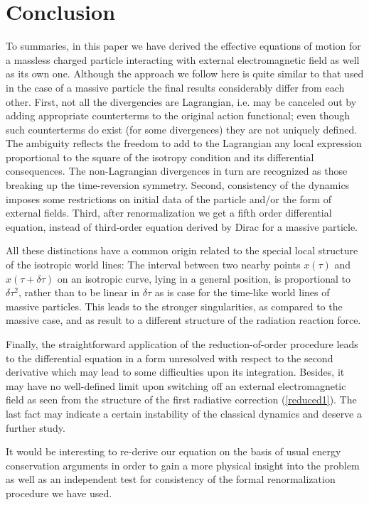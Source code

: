 \documentclass[a4paper,12pt]{article}
\begin{document}
\section{Conclusion}

To summaries, in this paper we have derived the effective
equations of motion for a massless charged particle interacting
with external electromagnetic field as well as its own one.
Although the approach we follow here is quite similar to that
used in the case of a massive particle \cite{KLS} the final
results considerably differ from each other. First, not all the
divergencies are Lagrangian, i.e. may be canceled out by adding
appropriate counterterms to the original action functional; even
though such counterterms do exist (for some divergences) they are
not uniquely defined. The ambiguity reflects the freedom to add to
the Lagrangian any local expression proportional to the square of
the isotropy condition and its differential consequences. The
non-Lagrangian divergences in turn are recognized as those
breaking up the time-reversion symmetry. Second, consistency of
the dynamics imposes some restrictions on initial data of the
particle and/or the form of external fields. Third, after
renormalization we get a fifth order differential equation,
instead of third-order equation derived by Dirac for a massive
particle.

All these distinctions have a common origin related to the special
local structure of the isotropic world lines: The interval
between two nearby points $x(\tau)$ and $x(\tau+\delta\tau)$ on
an isotropic curve, lying in a general position, is proportional
to $\delta\tau^2$, rather than to be linear in $\delta \tau$ as is
case for the time-like world lines of massive particles. This
leads to the stronger singularities, as compared to the massive
case, and as result to a different structure of the radiation
reaction force.




Finally, the straightforward application of the
reduction-of-order procedure leads to the differential equation in
a form unresolved with respect to the second derivative which may
lead to some difficulties upon its integration. Besides, it may
have no well-defined limit upon switching off an external
electromagnetic field as seen from the structure of the first
radiative correction (\ref{reduced1}). The last fact may indicate
a certain instability of the classical dynamics and deserve a
further study.


It would be interesting to re-derive our equation on the basis of
usual energy conservation arguments in order to gain a more
physical insight into the problem as well as an independent test
for consistency of the formal renormalization procedure we have
used.
\end{document}
